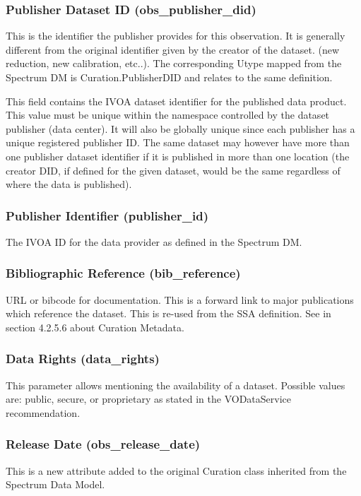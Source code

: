 \documentclass[11pt,a4paper]{ivoa}
\begin{document}
\subsubsection{Publisher Dataset ID (obs\_publisher\_did)}
This is the identifier the publisher provides for this observation. It is generally different from the original
identifier given by the creator of the dataset. (new reduction, new calibration, etc..).  The corresponding Utype
mapped from the Spectrum DM is Curation.PublisherDID and relates to the same definition.

This field contains the IVOA dataset identifier \citep{2007ivoa.spec.0314P} for the published data product. This value
must be unique within the namespace controlled by the dataset publisher (data center).  It will also be globally unique
since each publisher has a unique registered publisher ID.  The same dataset may however have more than one publisher
dataset identifier if it is published in more than one location (the creator DID, if defined for the given dataset,
would be the same regardless of where the data is published).

\subsubsection{Publisher Identifier (publisher\_id)}
The IVOA ID for the data provider as defined in the Spectrum DM.

\subsubsection{Bibliographic Reference (bib\_reference)}
URL or bibcode for documentation. This is a forward link to major publications which reference the dataset.  This is
re-used from the SSA definition. See \citep{2012ivoa.spec.0210T}  in section 4.2.5.6 about Curation Metadata.

\subsubsection{Data Rights (data\_rights)}
This parameter allows mentioning the availability of a dataset.  Possible values are: public, secure, or proprietary as
stated in the VODataService recommendation\citep{2010ivoa.spec.1202P}.

\subsubsection{Release Date (obs\_release\_date)}
This is a new attribute added to the original Curation class inherited from the Spectrum Data Model.
\end{document}
